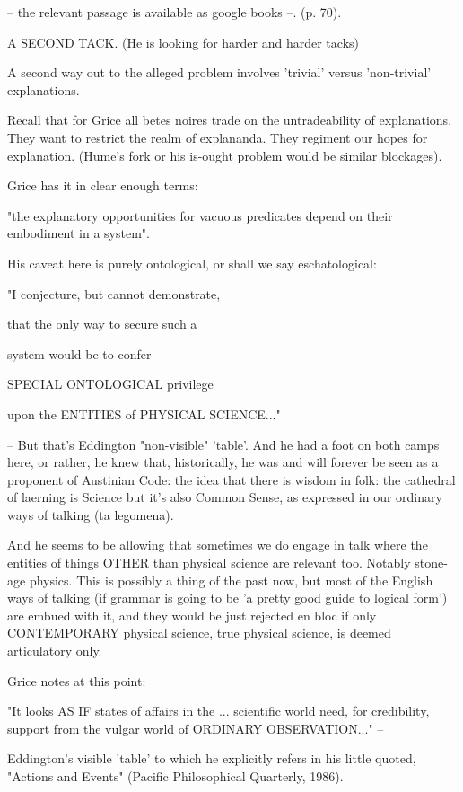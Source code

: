 \documentclass[10pt,titlepage]{book}
\begin{document}
-- the relevant passage is available as google books --. (p. 70).

A SECOND TACK. (He is looking for harder and harder tacks)

A second way out to the alleged problem involves 'trivial' versus
'non-trivial' explanations.

Recall that for Grice all betes noires trade on the untradeability of
explanations. They want to restrict the realm of explananda. They
regiment our hopes for explanation. (Hume's fork or his is-ought
problem would be similar blockages).

Grice has it in clear enough terms:

"the explanatory opportunities for vacuous predicates depend on their
embodiment in a system".

His caveat here is purely ontological, or shall we say eschatological:

"I conjecture, but cannot demonstrate,

that the only way to secure such a

system would be to confer

SPECIAL ONTOLOGICAL privilege

upon the ENTITIES of PHYSICAL SCIENCE..."

-- But that's Eddington "non-visible" 'table'. And he had a foot on
both camps here, or rather, he knew that, historically, he was and will
forever be seen as a proponent of Austinian Code: the idea that there
is wisdom in folk: the cathedral of laerning is Science but it's also
Common Sense, as expressed in our ordinary ways of talking (ta
legomena).

And he seems to be allowing that sometimes we do engage in talk where
the entities of things OTHER than physical science are relevant too.
Notably stone-age physics. This is possibly a thing of the past now,
but most of the English ways of talking (if grammar is going to be 'a
pretty good guide to logical form') are embued with it, and they would
be just rejected en bloc if only CONTEMPORARY physical science, true
physical science, is deemed articulatory only.

Grice notes at this point:

"It looks AS IF states of affairs in the
... scientific world need, for credibility,
support from the vulgar world of ORDINARY OBSERVATION..." --

Eddington's visible 'table' to which he explicitly refers in his
little quoted, "Actions and Events" (Pacific Philosophical Quarterly,
1986).
\end{document}
